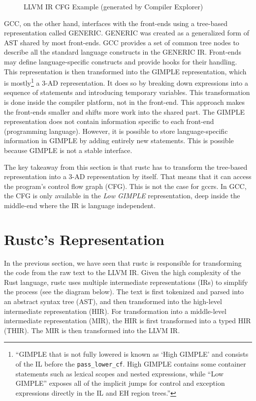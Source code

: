 \documentclass[
  11pt,
  twoside,symmetric]{report}
\begin{document}
\begin{figure}
\centering

\caption{LLVM IR CFG Example (generated by Compiler Explorer)}
\end{figure}

GCC, on the other hand, interfaces with the front-ends using a
tree-based representation called GENERIC. GENERIC was created as a generalized form of AST shared by most
front-ends. GCC provides a set of common tree nodes to describe all the
standard language constructs in the GENERIC IR. Front-ends may define
language-specific constructs and provide hooks for their
handling. This representation is
then transformed into the GIMPLE representation, which is
mostly\footnote{``GIMPLE that is not fully lowered is known as `High
  GIMPLE' and consists of the IL before the \texttt{pass\_lower\_cf}.
  High GIMPLE contains some container statements such as lexical scopes
  and nested expressions, while ``Low GIMPLE'' exposes all of the
  implicit jumps for control and exception expressions directly in the
  IL and EH region trees.''} a
3-AD representation. It does so by breaking down expressions into a
sequence of statements and introducing temporary variables. This
transformation is done inside the compiler platform, not in the
front-end. This approach makes the front-ends smaller and shifts more
work into the shared part. The GIMPLE representation does not contain
information specific to each front-end (programming language). However,
it is possible to store language-specific information in GIMPLE by
adding entirely new statements.
This is possible because GIMPLE is not a stable interface.

The key takeaway from this section is that rustc has to transform the
tree-based representation into a 3-AD representation by itself. That
means that it can access the program's control flow graph (CFG). This is
not the case for gccrs. In GCC, the CFG is only available in the
\emph{Low GIMPLE} representation, deep inside the middle-end where the
IR is language independent.

\section{Rustc's Representation}\label{rustcs-representation}

In the previous section, we have seen that rustc is responsible for
transforming the code from the raw text to the LLVM IR. Given the high
complexity of the Rust language, rustc uses multiple intermediate
representations (IRs) to simplify the process (see the diagram below).
The text is first tokenized and parsed into an abstract syntax tree
(AST), and then transformed into the high-level intermediate
representation (HIR). For transformation into a middle-level
intermediate representation (MIR), the HIR is first transformed into a
typed HIR (THIR). The MIR is then transformed into the LLVM IR.
\end{document}

